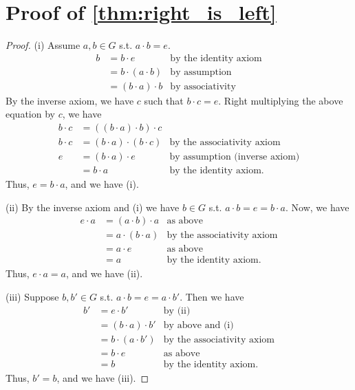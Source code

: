 \documentclass[12pt]{article}
\begin{document}
\section{Proof of \autoref{thm:right_is_left}}
\label{sec:proof_of_right_is_left}
\begin{proof}
    (i)
    Assume $a,b \in G$ s.t. $a \cdot b = e$.
    \begin{align*}
        b &= b\cdot e &\text{by the identity axiom} \\
          &= b \cdot (a \cdot b) &\text{by assumption}\\
          &= (b \cdot a) \cdot b &\text{by associativity}
    \end{align*}
    By the inverse axiom, we have $c$ such that $b \cdot c = e$.
    Right multiplying the above equation by $c$, we have
    \begin{align*}
        b \cdot c &= ((b \cdot a) \cdot b) \cdot c\\
        b \cdot c &= (b \cdot a) \cdot (b \cdot c) & \text{by the associativity axiom}\\
        e &= (b \cdot a) \cdot e & \text{by assumption (inverse axiom)}\\
          &= b \cdot a & \text{by the identity axiom}.
    \end{align*}
    Thus, $e = b\cdot a$, and we have (i).

    (ii)
    By the inverse axiom and (i) we have $b \in G$ s.t. $a \cdot b = e = b \cdot a$.
    Now, we have
    \begin{align*}
        e \cdot a &= (a \cdot b) \cdot a &\text{as above}\\
                  &= a \cdot (b \cdot a) &\text{by the associativity axiom}\\
                  &= a \cdot e &\text{as above}\\
                  &= a &\text{by the identity axiom}.
    \end{align*}
    Thus, $e \cdot a = a$, and we have (ii).

    (iii)
    Suppose $b,b' \in G$ s.t. $a\cdot b = e = a \cdot b'$. Then we have
    \begin{align*}
        b' &= e \cdot b' &\text{by (ii)}\\
           &= (b \cdot a) \cdot b' &\text{by above and (i)}\\
           &= b \cdot (a \cdot b') &\text{by the associativity axiom}\\
           &= b \cdot e &\text{as above}\\
           &= b &\text{by the identity axiom}.
    \end{align*}
    Thus, $b' = b$, and we have (iii).


\end{proof}
\end{document}
